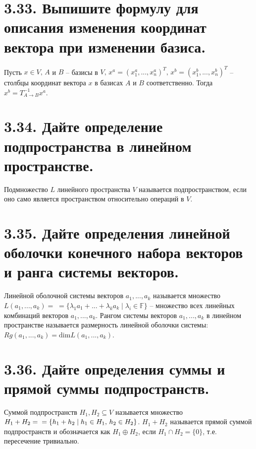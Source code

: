 \documentclass{article}
\begin{document}
\section*{\LARGE 3.33. Выпишите формулу для описания изменения координат вектора при изменении базиса. }
Пусть $x \in V,\, A$ и $B$ -- базисы в $V, \, x^a = (x_1^a, ..., x_n^a)^T, \, x^b = (x_1^b, ..., x_n^b)^T$ -- столбцы координат вектора $x$ в базисах $A$ и $B$ соответственно. Тогда $x^b = T_{A \rightarrow B}^{-1} x^a$.

\section*{\LARGE 3.34. Дайте определение подпространства в линейном пространстве. }
Подмножество $L$ линейного пространства $V$ называется подпространством, если оно само является пространством относительно операций в $V$.

\section*{\LARGE 3.35. Дайте определения линейной оболочки конечного набора векторов и ранга системы векторов. }
Линейной оболочной системы векторов $a_1, ..., a_k$ называется множество $L(a_1, ..., a_k) = \; = \{\lambda_1a_1 + ... + \lambda_ka_k \;|\; \lambda_i \in \mathbb{F} \}$ -- множество всех линейных комбинаций векторов $a_1, ..., a_k$.
\newline Рангом системы векторов $a_1, ..., a_k$ в линейном пространстве называется размерность линейной оболочки системы: $Rg(a_1, ..., a_k) = \mbox{dim}L(a_1,...,a_k)$.

\section*{\LARGE 3.36. Дайте определения суммы и прямой суммы подпространств. }
Суммой подпространств $H_1, H_2 \subseteq V$ называется множество $H_1 + H_2 = \newline = \{h_1 + h_2 \;|\; h_1 \in H_1,\, h_2 \in H_2\}$. $H_1 + H_2$ называется прямой суммой подпространств и обозначается как $H_1 \oplus H_2$, если $H_1 \cap H_2 = \{0\}$, т.е. пересечение тривиально.
\end{document}
